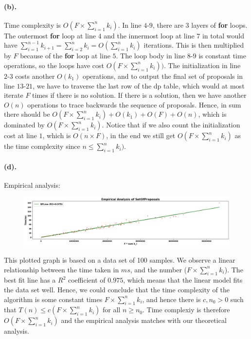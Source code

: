 \documentclass[12pt]{article}
\begin{document}
\paragraph{(b).} Time complexity is \(O(F \times \sum_{i=1}^{n} k_i)\). In line \(4\text{-}9\), there are \(3\) layers of \textbf{for} loops. The outermost \textbf{for} loop at line \(4\) and the innermost loop at line \(7\) in total would have \(\sum_{i=1}^{n-1} k_{i+1} = \sum_{i=2}^{n} k_{i} = O(\sum_{i=1}^{n} k_{i})\) iterations. This is then multiplied by \(F\) because of the \textbf{for} loop at line \(5\). The loop body in line \(8\text{-}9\) is constant time operations, so the loops have cost \(O(F \times \sum_{i=1}^{n} k_i))\). The initialization in line \(2\textbf{-}3\) costs another \(O(k_1)\) operations, and to output the final set of proposals in line \(13\text{-}21\), we have to traverse the last row of the dp table, which would at most iterate \(F\) times if there is no solution. If there is a solution, then we have another \(O(n)\) operations to trace backwards the sequence of proposals. Hence, in sum there should be \(O(F \times \sum_{i=1}^{n} k_i) + O(k_1) + O(F) + O(n)\), which is dominated by \(O(F \times \sum_{i=1}^{n} k_i)\). Notice that if we also count the initialization cost at line \(1\), which is \(O(n \times F)\), in the end we still get \(O(F \times \sum_{i=1}^{n} k_i)\) as the time complexity since \(n \leq \sum_{i=1}^{n} k_i)\).

\paragraph{(d).}
Empirical analysis:
\begin{figure}[H]
     \centering
     \includegraphics[width = \textwidth]{q6d.png}
\end{figure}
\noindent This plotted graph is based on a data set of 100 samples. We observe a linear relationship between the time taken in \(ms\), and the number  (\(F \times \sum_{i=1}^n k_i\)). The best fit line has a \(R^2\) coefficient of \(0.975\), which means that the linear model fits the data set well. Hence, we could conclude that the time complexity of the algorithm is some constant times \(F \times \sum_{i=1}^n k_i\), and hence there is \(c, n_0 > 0\) such that \(T(n) \leq c(F\times \sum_{i=1}^n k_i)\) for all \(n \geq n_0\). Time complexiy is therefore \(O(F \times \sum_{i=1}^n k_i)\) and the empirical analysis matches with our theoretical analysis. 


\end{document}
